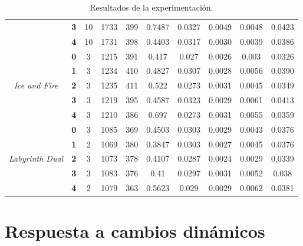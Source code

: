 \begin{landscape}
\begin{table}[]
{\begin{tabular}{|c|c|cccccccc|}
                                         & \textbf{3} & 10 & 1733 & 399 & 0.7487 & 0.0327 & 0.0049 & 0.0048 & 0.0423 \\ \cline{2-10} 
                                         & \textbf{4} & 10 & 1731 & 398 & 0.4403 & 0.0317 & 0.0030 & 0.0039 & 0.0386 \\ \hline
\multirow{5}{*}{\textit{Ice and Fire}}   & \textbf{0} & 3  & 1215 & 391 & 0.417  & 0.027  & 0.0026 & 0.003  & 0.0326 \\ \cline{2-10} 
                                         & \textbf{1} & 3  & 1234 & 410 & 0.4827 & 0.0307 & 0.0028 & 0.0056 & 0.0390 \\ \cline{2-10} 
                                         & \textbf{2} & 3  & 1235 & 411 & 0.522  & 0.0273 & 0.0031 & 0.0045 & 0.0349 \\ \cline{2-10} 
                                         & \textbf{3} & 3  & 1219 & 395 & 0.4587 & 0.0323 & 0.0029 & 0.0061 & 0.0413 \\ \cline{2-10} 
                                         & \textbf{4} & 3  & 1210 & 386 & 0.697  & 0.0273 & 0.0031 & 0.0055 & 0.0359 \\ \hline
\multirow{5}{*}{\textit{Labyrinth Dual}} & \textbf{0} & 3  & 1085 & 369 & 0.4503 & 0.0303 & 0.0029 & 0.0043 & 0.0376 \\ \cline{2-10} 
                                         & \textbf{1} & 2  & 1069 & 380 & 0.3847 & 0.0303 & 0.0027 & 0.0045 & 0.0376 \\ \cline{2-10} 
                                         & \textbf{2} & 3  & 1073 & 378 & 0.4107 & 0.0287 & 0.0024 & 0.0029 & 0,0339 \\ \cline{2-10} 
                                         & \textbf{3} & 3  & 1083 & 376 & 0.41   & 0.0297 & 0.0031 & 0.0052 & 0.038  \\ \cline{2-10} 
                                         & \textbf{4} & 2  & 1079 & 363 & 0.5623 & 0.029  & 0.0029 & 0.0062 & 0.0381 \\ \hline
\end{tabular}%
}
\caption{Resultados de la experimentación.}
\label{tab:exp-results}
\end{table}
\end{landscape}

\section{Respuesta a cambios dinámicos}


